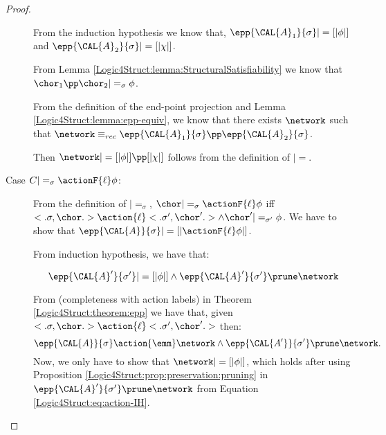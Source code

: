 \begin{proof}
\begin{description}
  From the induction hypothesis we know that,
  $\epp{\CAL{A}_1}{\sigma} |= [| \phi |]$ and $\epp{\CAL{A}_2}{\sigma}
  |= [| \chi |]$. 

  From Lemma
  \ref{Logic4Struct:lemma:StructuralSatisfiability} we know that $\chor_1 \pp
  \chor_2 |=_\sigma \phi$.

 From the definition of the end-point projection and 
  Lemma \ref{Logic4Struct:lemma:epp-equiv}, we know that there exists
  $\network$ such that $\network \equiv_{rec} \epp{\CAL{A}_1}{\sigma}
  \pp \epp{\CAL{A}_2}{\sigma}$. 

  Then $\network |= [| \phi |] \pp [|
  \chi |]$ follows from the definition of $|=$.


\item[Case $C |=_\sigma \actionF{\ell} \phi$:]

 From the definition of $|=_\sigma$, $\chor |=_\sigma \actionF{\ell}
  \phi$ iff $<. \sigma, \chor.> \action{\ell} <. \sigma', \chor' .>
  \land \chor' |=_{\sigma'} \phi$.  We have to show that
  $\epp{\CAL{A}}{\sigma} |= [| \actionF{\ell} \phi |]$.

From induction hypothesis, we have that:

\begin{equation} \label{Logic4Struct:eq:action-IH}
  \epp{\CAL{A}'}{\sigma'} |= [| \phi |] \land
  \epp{\CAL{A}'}{\sigma'} \prune \network
\end{equation}

From (completeness with action labels) in Theorem \ref{Logic4Struct:theorem:epp} we
have that, given $<. \sigma, \chor.>
\action{\ell} <. \sigma', \chor' .>$ then:
  \begin{equation} \label{Logic4Struct:eq:action1}
    \epp{\CAL{A}}{\sigma} \action{\emm} \network \land
    \epp{\CAL{A'}}{\sigma'} \prune \network.
  \end{equation}
Now, we only have to show that $\network |= [| \phi |]$, which holds
after using  Proposition \ref{Logic4Struct:prop:preservation:pruning} in
$\epp{\CAL{A}'}{\sigma'} \prune \network $ from Equation \ref{Logic4Struct:eq:action-IH}.




\end{description}
\end{proof}
